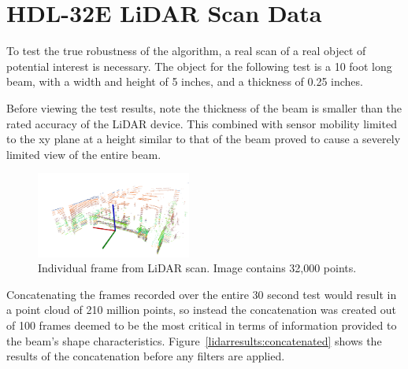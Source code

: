 \documentclass[12pt]{drexelthesis}
\let\Oldsection\section
\renewcommand{\section}{\FloatBarrier\Oldsection}
\begin{document}
\section{HDL-32E LiDAR Scan Data}
To test the true robustness of the algorithm, a real scan of a real object of potential interest is necessary. The object for the following test is a 10 foot long beam, with a width and height of 5 inches, and a thickness of 0.25 inches.

Before viewing the test results, note the thickness of the beam is smaller than the rated accuracy of the LiDAR device. This combined with sensor mobility limited to the xy plane at a height similar to that of the beam proved to cause a severely limited view of the entire beam.


\begin{figure}[!ht]
	\centering
		\includegraphics[width=2in]{cloudCollection/lidar5frames.png}
		\caption[Individual LiDAR scan frame]{\centering Individual frame from LiDAR scan. Image contains 32,000 points.}
	\label{lidarresults:singlescan}
\end{figure}

Concatenating the frames recorded over the entire 30 second test would result in a point cloud of 210 million points, so instead the concatenation was created out of 100 frames deemed to be the most critical in terms of information provided to the beam's shape characteristics. Figure~\ref{lidarresults:concatenated} shows the results of the concatenation before any filters are applied.
\end{document}
